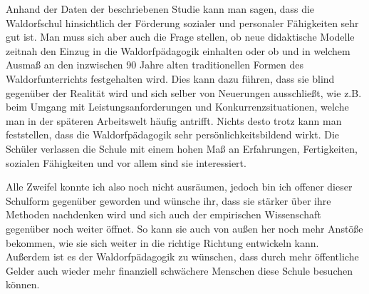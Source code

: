 Anhand der Daten der beschriebenen Studie kann man sagen, dass die Waldorfschul hinsichtlich der Förderung sozialer und personaler Fähigkeiten sehr gut ist. Man muss sich aber auch die Frage stellen, ob neue didaktische Modelle zeitnah den Einzug in die Waldorfpädagogik einhalten oder ob und in welchem Ausmaß an den inzwischen 90 Jahre alten traditionellen Formen des Waldorfunterrichts festgehalten wird. Dies kann dazu führen, dass sie blind gegenüber der Realität wird und sich selber von Neuerungen ausschließt, wie z.B. beim Umgang mit Leistungsanforderungen und Konkurrenzsituationen, welche man in der späteren Arbeitswelt häufig antrifft. Nichts desto trotz kann man feststellen, dass die Waldorfpädagogik sehr persönlichkeitsbildend wirkt. Die Schüler verlassen die Schule mit einem hohen Maß an Erfahrungen, Fertigkeiten, sozialen Fähigkeiten und vor allem sind sie interessiert. 

Alle Zweifel konnte ich also noch nicht ausräumen, jedoch bin ich offener dieser Schulform gegenüber geworden und wünsche ihr, dass sie stärker über ihre Methoden nachdenken wird und sich auch der empirischen Wissenschaft gegenüber noch weiter öffnet. So kann sie auch von außen her noch mehr Anstöße bekommen, wie sie sich weiter in die richtige Richtung entwickeln kann. Außerdem ist es der Waldorfpädagogik zu wünschen, dass durch mehr öffentliche Gelder auch wieder mehr finanziell schwächere Menschen diese Schule besuchen können. 



